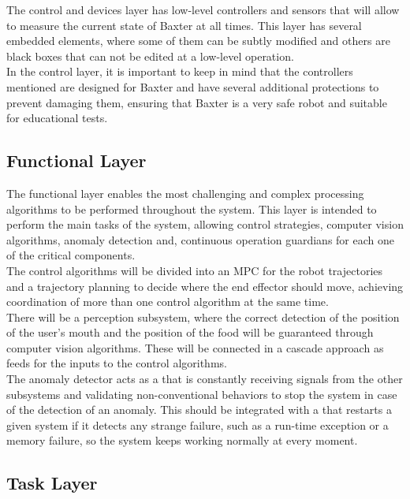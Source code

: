 \documentclass[11pt]{report} %
\begin{document}
The control and devices layer has low-level controllers and sensors that will allow to measure the current state of Baxter at all times. This layer has several embedded elements, where some of them can be subtly modified and others are black boxes that can not be edited at a low-level operation.\\

In the control layer, it is important to keep in mind that the controllers mentioned are designed for Baxter and have several additional protections to prevent damaging them, ensuring that Baxter is a very safe robot and suitable for educational tests.\\


\subsection{Functional Layer}

The functional layer enables the most challenging and complex processing algorithms to be performed throughout the system. This layer is intended to perform the main tasks of the system, allowing control strategies, computer vision algorithms, anomaly detection and, continuous operation guardians for each one of the critical components.\\

The control algorithms will be divided into an MPC for the robot trajectories and a trajectory planning to decide where the end effector should move, achieving coordination of more than one control algorithm at the same time.\\

There will be a perception subsystem, where the correct detection of the position of the user's mouth and the position of the food will be guaranteed through computer vision algorithms. These will be connected in a cascade approach as feeds for the inputs to the control algorithms.\\

The anomaly detector acts as a  that is constantly receiving signals from the other subsystems and validating non-conventional behaviors to stop the system in case of the detection of an anomaly. This should be integrated with a  that restarts a given system if it detects any strange failure, such as a run-time exception or a memory failure, so the system keeps working normally at every moment.\\

\subsection{Task Layer}
\end{document}
